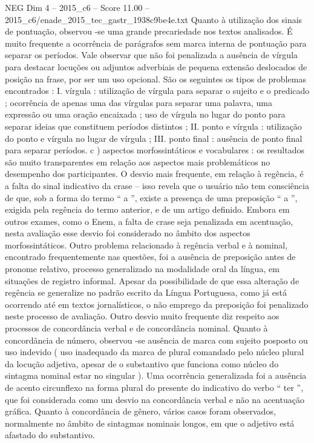 \begin{textsample}{NEG Dim 4 – 2015\_c6 – Score 11.00 – 2015\_c6/enade\_2015\_tec\_gastr\_1938c9be4e.txt}
Quanto à utilização dos sinais de pontuação, observou -se uma grande precariedade nos textos analisados.
É muito frequente a ocorrência de parágrafos sem marca interna de pontuação para separar os períodos.
Vale observar que não foi penalizada a ausência de vírgula para destacar locuções ou adjuntos adverbiais de pequena extensão deslocados de posição na frase, por ser um uso opcional.
São os seguintes os tipos de problemas encontrados : I. vírgula : utilização de vírgula para separar o sujeito e o predicado ; ocorrência de apenas uma das vírgulas para separar uma palavra, uma expressão ou uma oração encaixada ; uso de vírgula no lugar do ponto para separar ideias que constituem períodos distintos ; II. ponto e vírgula : utilização do ponto e vírgula no lugar de vírgula ; III. ponto final : ausência de ponto final para separar períodos. c ) aspectos morfossintáticos e vocabulares : os resultados são muito transparentes em relação aos aspectos mais problemáticos no desempenho dos participantes.
O desvio mais frequente, em relação à regência, é a falta do sinal indicativo da crase – isso revela que o usuário não tem consciência de que, sob a forma do termo “ a ”, existe a presença de uma preposição “ a ”, exigida pela regência do termo anterior, e de um artigo definido.
Embora em outros exames, como o Enem, a falta de crase seja penalizada em acentuação, nesta avaliação esse desvio foi considerado no âmbito dos aspectos morfossintáticos.
Outro problema relacionado à regência verbal e à nominal, encontrado frequentemente nas questões, foi a ausência de preposição antes de pronome relativo, processo generalizado na modalidade oral da língua, em situações de registro informal.
Apesar da possibilidade de que essa alteração de regência se generalize no padrão escrito da Língua Portuguesa, como já está ocorrendo até em textos jornalísticos, o não emprego da preposição foi penalizado neste processo de avaliação.
Outro desvio muito frequente diz respeito aos processos de concordância verbal e de concordância nominal.
Quanto à concordância de número, observou -se ausência de marca com sujeito posposto ou uso indevido ( uso inadequado da marca de plural comandado pelo núcleo plural da locução adjetiva, apesar de o substantivo que funciona como núcleo do sintagma nominal estar no singular ).
Uma ocorrência generalizada foi a ausência de acento circunflexo na forma plural do presente do indicativo do verbo “ ter ”, que foi considerada como um desvio na concordância verbal e não na acentuação gráfica.
Quanto à concordância de gênero, vários casos foram observados, normalmente no âmbito de sintagmas nominais longos, em que o adjetivo está afastado do substantivo.

\end{textsample}
